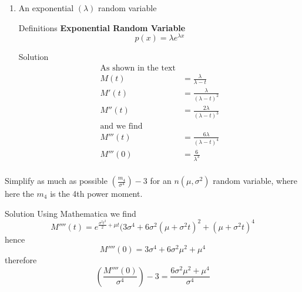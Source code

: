 \documentclass{article}
\begin{document}
\begin{spacing}{1.1}
\begin{homeworkProblem}
\begin{enumerate}[(1)]
    \item An exponential $(\lambda)$ random variable
      \begin{homeworkSection}{Definitions}
        {\bf Exponential Random Variable}
          \[p(x) = \lambda e^{\lambda x}\]
      \end{homeworkSection}
      \begin{homeworkSection}{Solution}
        \begin{align*}
          \text{As shown in the text}\\
          M(t) &= \frac{ \lambda}{ \lambda - t}\\
          M'(t) &= \frac{ \lambda}{ (\lambda - t)^2}\\
          M''(t) &= \frac{ 2\lambda}{ (\lambda - t)^3}\\
          \text{and we find}\\
          M'''(t) &= \frac{ 6\lambda}{ (\lambda - t)^4}\\
          M'''(0) &= \frac{ 6}{ \lambda^3}\\
        \end{align*}
      \end{homeworkSection}
  \end{enumerate}
\end{homeworkProblem}

\newpage
\begin{homeworkProblem}
  Simplify as much as possible $\left(\frac{ m_4}{ \sigma^4}\right) - 3$ 
  for an $n(\mu, \sigma^2)$ random variable, where here the $m_4$ is the
  4th power moment.
  \begin{homeworkSection}{Solution}
    Using Mathematica we find
      \[M''''(t) = e^{\frac{ \sigma^2 t^2}{ 2} + \mu t} (3 \sigma^4 + 6 \sigma^2 (\mu + \sigma^2 t)^2 + (\mu + \sigma^2 t)^4\]
    hence
      \[M''''(0) = 3 \sigma^4 + 6 \sigma^2 \mu^2 + \mu^4\]
    therefore
      \[\left(\frac{ M''''(0) }{ \sigma^4}\right) - 3 = \frac{6 \sigma^2 \mu^2 + \mu^4}{ \sigma^4}\]
  \end{homeworkSection}
\end{homeworkProblem}


\end{spacing}
\end{document}
